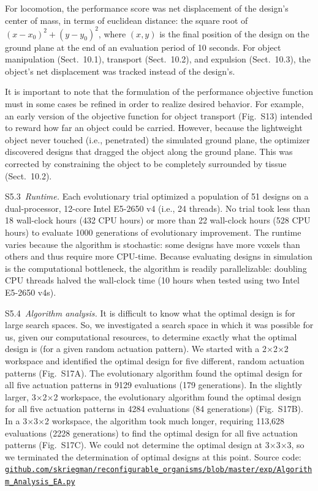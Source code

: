 For locomotion, the performance score was net displacement of the design's center of mass, in terms of euclidean distance: the square root of $(x-x_0)^2 + (y-y_0)^2$, where $(x, y)$ is the final position of the design on the ground plane at the end of an evaluation period of 10 seconds. 
For object manipulation (Sect.~10.1), transport (Sect.~10.2), and expulsion (Sect.~10.3), the object's net displacement was tracked instead of the design's.

It is important to note that the formulation of the performance objective function must in some cases be refined in order to realize desired behavior. 
For example, an early version of the objective function for object transport (Fig.~S13) intended to reward how far an object could be carried. 
However, because the lightweight object never touched (i.e., penetrated) the simulated ground plane, the optimizer discovered designs that dragged the object along the ground plane. 
This was corrected by constraining the object to be completely surrounded by tissue (Sect.~10.2).

\vspace{1em}

S5.3~\textit{Runtime.}
Each evolutionary trial optimized a population of 51 designs on a dual-processor, 12-core Intel E5-2650 v4 (i.e., 24 threads). 
No trial took less than 18 wall-clock hours (432 CPU hours) or more than 22 wall-clock hours (528 CPU hours) to evaluate 1000 generations of evolutionary improvement. 
The runtime varies because the algorithm is stochastic: some designs have more voxels than others and thus require more CPU-time. 
Because evaluating designs in simulation is the computational bottleneck, the algorithm is readily parallelizable: doubling CPU threads halved the wall-clock time (10 hours when tested using two Intel E5-2650 v4s).

\vspace{1em}

S5.4~\textit{Algorithm analysis.}
It is difficult to know what the optimal design is for large search spaces. 
So, we investigated a search space in which it was possible for us, given our computational resources, to determine exactly what the optimal design is (for a given random actuation pattern). 
We started with a 2{$\times$}2{$\times$}2 workspace and identified the optimal design for five different, random actuation patterns (Fig.~S17A). 
The evolutionary algorithm found the optimal design for all five actuation patterns in 9129 evaluations (179 generations). 
In the slightly larger, 3{$\times$}2{$\times$}2 workspace, the evolutionary algorithm found the optimal design for all five actuation patterns in 4284 evaluations (84 generations) (Fig.~S17B). 
In a 3{$\times$}3{$\times$}2 workspace, the algorithm took much longer, requiring 113,628 evaluations (2228 generations) to find the optimal design for all five actuation patterns (Fig.~S17C). 
We could not determine the optimal design at 3{$\times$}3{$\times$}3, so we terminated the determination of optimal designs at this point. 
Source code:
\href{https://github.com/skriegman/reconfigurable_organisms/blob/master/exp/Algorithm_Analysis_EA.py}{\scriptsize\tt\color{blue}github.com/skriegman/reconfigurable\_organisms/blob/master/exp/Algorithm\_Analysis\_EA.py}


